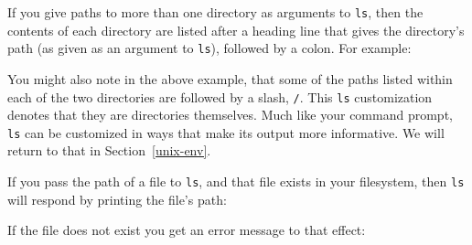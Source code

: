 \documentclass[]{krantz}
\makeatletter
\newenvironment{Shaded}{\begin{snugshade}}{\end{snugshade}}
\newcommand{\ExtensionTok}[1]{#1}
\newcommand{\NormalTok}[1]{#1}
\newenvironment{kframe}{%
\medskip{}
\setlength{\fboxsep}{.8em}
 \def\at@end@of@kframe{}%
 \ifinner\ifhmode%
  \def\at@end@of@kframe{\end{minipage}}%
  \begin{minipage}{\columnwidth}%
 \fi\fi%
 \def\FrameCommand##1{\hskip\@totalleftmargin \hskip-\fboxsep
 \colorbox{shadecolor}{##1}\hskip-\fboxsep
     \hskip-\linewidth \hskip-\@totalleftmargin \hskip\columnwidth}%
 \MakeFramed {\advance\hsize-\width
   \@totalleftmargin\z@ \linewidth\hsize
   \@setminipage}}%
 {\par\unskip\endMakeFramed%
 \at@end@of@kframe}
\renewenvironment{Shaded}{\begin{kframe}}{\end{kframe}}
\makeatother
\begin{document}
If you give paths to more than one directory as arguments to \texttt{ls}, then
the contents of each directory are listed after a heading line that gives
the directory's path (as given as an argument to \texttt{ls}), followed by a colon. For example:

\begin{Shaded}
\end{Shaded}

You might also note in the above example, that some of the paths listed within
each of the two directories are followed by a slash, \texttt{/}. This \texttt{ls} customization denotes that
they are directories themselves. Much like your command prompt, \texttt{ls} can be customized in ways
that make its output more informative. We will return to that in Section~\ref{unix-env}.

If you pass the path of a file to \texttt{ls}, and that file exists in your filesystem,
then \texttt{ls} will respond by printing the file's path:

\begin{Shaded}
\end{Shaded}

If the file does not exist you get an error message to that effect:

\begin{Shaded}
\end{Shaded}
\end{document}
